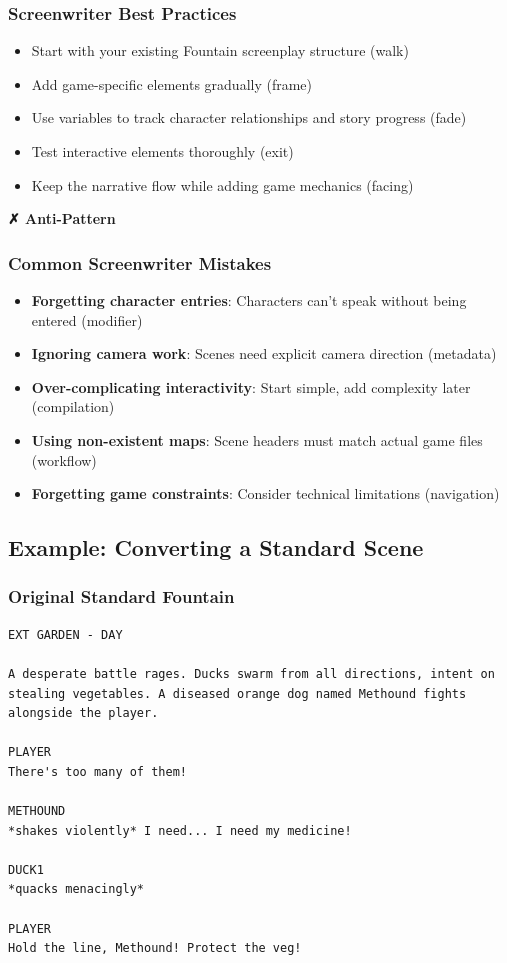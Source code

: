 \documentclass[11pt,letterpaper,oldstylefigures]{memoir}
\newenvironment{AntiPattern}
{\begingroup
\small
\setlength{\parindent}{0pt}
\setlength{\parskip}{0.5em}
\allowdisplaybreaks
\setlength{\displaywidowpenalty}{0}
\setlength{\widowpenalty}{0}
\setlength{\clubpenalty}{0}
\setlength{\interlinepenalty}{0}
\begin{tcolorbox}[
    colback=red!5,
    colframe=red!75!black,
    boxrule=0.5pt,
    arc=2pt,
    left=0.5em,
    right=0.5em,
    top=0.25em,
    bottom=0.25em
]
\textbf{✗ Anti-Pattern}
\end{tcolorbox}\par
}
{\endgroup}
\begin{document}
\subsubsection{Screenwriter Best Practices}
\begin{itemize}
\item Start with your existing Fountain screenplay structure (\gls{walk})
\item Add game-specific elements gradually (\gls{frame})
\item Use variables to track character relationships and story progress (\gls{fade})
\item Test interactive elements thoroughly (\gls{exit})
\item Keep the narrative flow while adding game mechanics (\gls{facing})
\end{itemize}


\begin{AntiPattern}
\subsubsection{Common Screenwriter Mistakes}
\begin{itemize}
\item \textbf{Forgetting character entries}: Characters can't speak without being entered (\gls{modifier})
\item \textbf{Ignoring camera work}: Scenes need explicit camera direction (\gls{metadata})
\item \textbf{Over-complicating interactivity}: Start simple, add complexity later (\gls{compilation})
\item \textbf{Using non-existent maps}: Scene headers must match actual game files (\gls{workflow})
\item \textbf{Forgetting game constraints}: Consider technical limitations (\gls{navigation})
\end{itemize}
\end{AntiPattern}

\subsection{Example: Converting a Standard Scene}

\subsubsection{Original Standard Fountain}
\begin{verbatim}
EXT GARDEN - DAY

A desperate battle rages. Ducks swarm from all directions, intent on stealing vegetables. A diseased orange dog named Methound fights alongside the player.

PLAYER
There's too many of them!

METHOUND
*shakes violently* I need... I need my medicine!

DUCK1
*quacks menacingly*

PLAYER
Hold the line, Methound! Protect the veg!
\end{verbatim}
\end{document}
